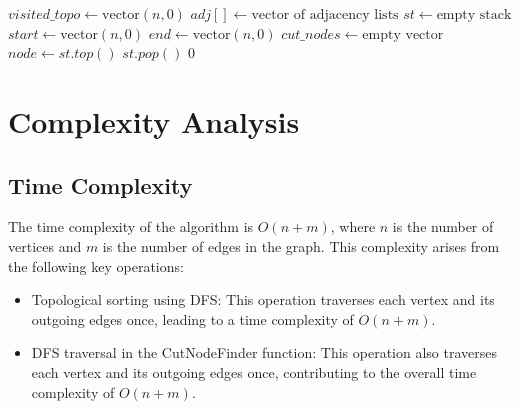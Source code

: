 \documentclass{article}
\begin{document}
\begin{algorithm}
\begin{algorithmic}[1]
            \State $visited\_topo \gets \text{vector}(n, 0)$ 
            \State $adj[] \gets \text{vector of adjacency lists}$ 
            \State $st \gets \text{empty stack}$ 
             
                 
                    \State {} 
                \EndIf
            \EndFor
            \State $start \gets \text{vector}(n, 0)$ 
            \State $end \gets \text{vector}(n, 0)$ 
            \State $cut\_nodes \gets \text{empty vector}$ 
             
                \State $node \gets st.top()$ 
                \State $st.pop()$ 
                 
                    \State {} 
                \EndIf
            \EndWhile
            \State \Return $0$ 
        \EndFunction
        
        \end{algorithmic}
    \end{algorithm}


\section{Complexity Analysis}
    \subsection{Time Complexity}
        The time complexity of the algorithm is $O(n + m)$, where $n$ is the number of vertices and $m$ is the number of edges in the graph. This complexity arises from the following key operations:
        \begin{itemize}
            \item Topological sorting using DFS: This operation traverses each vertex and its outgoing edges once, leading to a time complexity of $O(n + m)$.
            \item DFS traversal in the CutNodeFinder function: This operation also traverses each vertex and its outgoing edges once, contributing to the overall time complexity of $O(n + m)$.
        \end{itemize}
\end{document}
